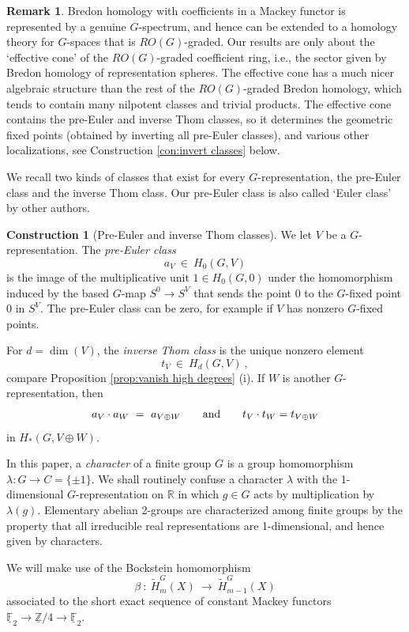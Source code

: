\documentclass{amsart}[12pt]
\newcommand{\mF}{{\mathbb F}}
\newcommand{\mR}{{\mathbb R}}
\newcommand{\mZ}{{\mathbb Z}}
\renewcommand{\to}{\longrightarrow}
\numberwithin{equation}{section}
\theoremstyle{definition}
\newtheorem{rk}[equation]{Remark}
\newtheorem{construction}[equation]{Construction}
\begin{document}
\begin{rk}
  Bredon homology with coefficients in a Mackey functor is represented by
  a genuine $G$-spectrum, and hence can be extended to a homology theory
  for $G$-spaces that is $R O(G)$-graded. Our results are only about
  the `effective cone' of the $R O(G)$-graded coefficient ring,
  i.e., the sector given by Bredon homology of representation spheres.
  The effective cone has a much nicer algebraic structure than the rest
  of the $R O(G)$-graded Bredon homology, which tends to contain
  many nilpotent classes and trivial products.
  The effective cone contains the pre-Euler and inverse Thom classes,
  so it determines the geometric fixed points (obtained by inverting all pre-Euler classes),
  and various other localizations, see Construction \ref{con:invert classes} below.
\end{rk}


We recall two kinds of classes that exist for every $G$-representation,
the pre-Euler class and the inverse Thom class.
Our pre-Euler class is also called `Euler class' by other authors.

\begin{construction}[Pre-Euler and inverse Thom classes]
  We let $V$ be  a $G$-representation. The {\em pre-Euler class}
  \[ a_V\ \in \ H_0(G,V) \]
  is the image of the multiplicative unit $1\in H_0(G,0)$
  under the homomorphism induced by the based $G$-map $S^0\to S^V$
  that sends the point $0$ to the $G$-fixed point $0$ in $S^V$.
  The pre-Euler class can be zero, for example if $V$ has nonzero $G$-fixed points.
  
  For $d=\dim(V)$, the {\em inverse Thom class} is the unique nonzero element
  \[ t_V\ \in \ H_d(G,V)\ , \]
  compare Proposition \ref{prop:vanish high degrees} (i).
  If $W$ is another $G$-representation, then
  \[ a_V\cdot a_W\ =\ a_{V\oplus W}\text{\qquad and\qquad} t_V\cdot t_W=t_{V\oplus W}\]
  in $H_*(G,V\oplus W)$.
\end{construction}

In this paper, a {\em character} of a finite group $G$
is a group homomorphism $\lambda:G\to C=\{\pm 1\}$.
We shall routinely confuse a character $\lambda$
with the 1-dimensional $G$-representation on $\mR$ in which $g\in G$
acts by multiplication by $\lambda(g)$.
Elementary abelian 2-groups are characterized among finite groups
by the property that all irreducible real representations are 1-dimensional,
and hence given by characters.

We will make use of the Bockstein homomorphism
\[ \beta\ : \ \tilde H_m^G(X)\ \to \ \tilde H_{m-1}^G(X) \]
associated to the short exact sequence of constant Mackey functors
$\underline\mF_2\to\underline\mZ/4\to\underline\mF_2$. 
\end{document}
